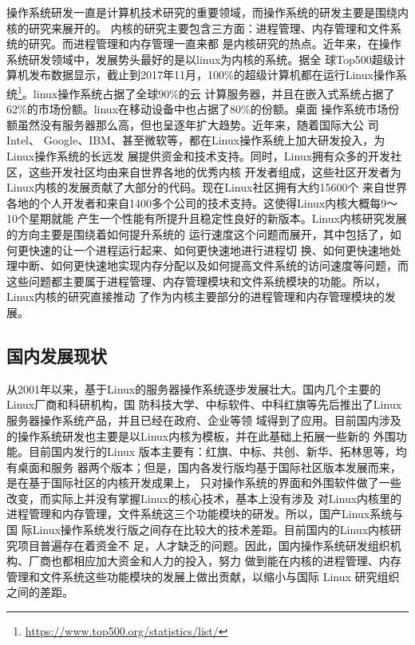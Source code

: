 \documentclass{swfcthesismscctex}
\begin{document}
操作系统研发一直是计算机技术研究的重要领域，而操作系统的研发主要是围绕内核的研究来展开的。
内核的研究主要包含三方面：进程管理、内存管理和文件系统的研究。而进程管理和内存管理一直来都
是内核研究的热点。近年来，在操作系统研发领域中，发展势头最好的是以linux为内核的系统。据全
球Top500超级计算机发布数据显示，截止到2017年11月，100\%的超级计算机都在运行Linux操作系
统\footnote{\url{https://www.top500.org/statistics/list/}}。linux操作系统占据了全球90\%的云
计算服务器，并且在嵌入式系统占据了62\%的市场份额。linux在移动设备中也占据了80\%的份额。桌面
操作系统市场份额虽然没有服务器那么高，但也呈逐年扩大趋势。近年来，随着国际大公
司Intel、 Google、IBM、甚至微软等，都在Linux操作系统上加大研发投入，为Linux操作系统的长远发
展提供资金和技术支持。同时，Linux拥有众多的开发社区，这些开发社区均由来自世界各地的优秀内核
开发者组成，这些社区开发者为Linux内核的发展贡献了大部分的代码。现在Linux社区拥有大约15600个
来自世界各地的个人开发者和来自1400多个公司的技术支持。这使得Linux内核大概每9～10个星期就能
产生一个性能有所提升且稳定性良好的新版本。Linux内核研究发展的方向主要是围绕着如何提升系统的
运行速度这个问题而展开，其中包括了，如何更快速的让一个进程运行起来、如何更快速地进行进程切
换、如何更快速地处理中断、如何更快速地实现内存分配以及如何提高文件系统的访问速度等问题，而
这些问题都主要属于进程管理、内存管理模块和文件系统模块的功能。所以，Linux内核的研究直接推动
了作为内核主要部分的进程管理和内存管理模块的发展。

\subsection{国内发展现状}

从2001年以来，基于Linux的服务器操作系统逐步发展壮大。国内几个主要的Linux厂商和科研机构，国
防科技大学、中标软件、中科红旗等先后推出了Linux服务器操作系统产品，并且已经在政府、企业等领
域得到了应用。目前国内涉及的操作系统研发也主要是以Linux内核为模板，并在此基础上拓展一些新的
外围功能。目前国内发行的Linux 版本主要有：红旗、中标、共创、新华、拓林思等，均有桌面和服务
器两个版本；但是，国内各发行版均基于国际社区版本发展而来，是在基于国际社区的内核开发成果上，
只对操作系统的界面和外围软件做了一些改变，而实际上并没有掌握Linux的核心技术，基本上没有涉及
对Linux内核里的进程管理和内存管理，文件系统这三个功能模块的研发。所以，国产Linux系统与国
际Linux操作系统发行版之间存在比较大的技术差距。目前国内的Linux内核研究项目普遍存在着资金不
足，人才缺乏的问题。因此，国内操作系统研发组织机构、厂商也都相应加大资金和人力的投入，努力
做到能在内核的进程管理、内存管理和文件系统这些功能模块的发展上做出贡献，以缩小与国际 Linux
研究组织之间的差距。
\end{document}
